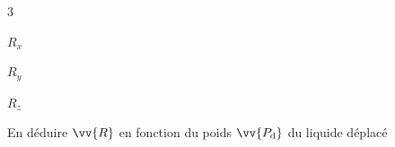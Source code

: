 \debutEntrainement

\begin{multicols}{3}

\begin{enonce}
$R_x$
\end{enonce}

\reponse{}


\begin{enonce}
$R_y$
\end{enonce}

\reponse{}


\begin{enonce}
$R_z$
\end{enonce}

\reponse{}

\end{multicols}

\begin{enonce}
En déduire $\vv{R}$ en fonction du poids $\vv{P_\text{d}}$ du liquide déplacé
\end{enonce}

\reponse{}



\finEntrainement





